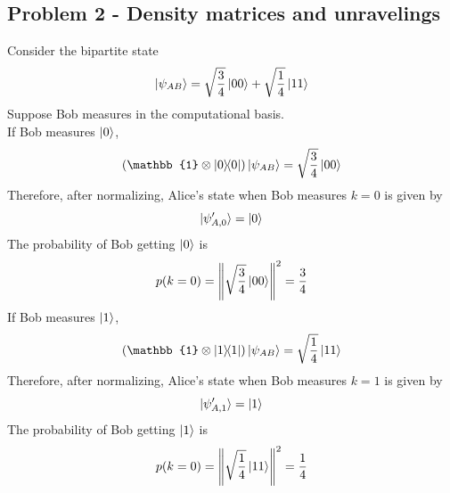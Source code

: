 \subsection{Problem 2 - Density matrices and unravelings}
Consider the bipartite state 
\begin{equation}
    \ket{\psi_{AB}} = \sqrt{\frac{3}{4}}\ket{00} + \sqrt{\frac{1}{4}}\ket{11}
\end{equation}
Suppose Bob measures in the computational basis. \\
If Bob measures $\ket{0}$, 
\begin{align}
    (\mathbb{1} \otimes \ketbra{0}{0}) \ket{\psi_{AB}} = \sqrt{\frac{3}{4}}\ket{00}
\end{align}
Therefore, after normalizing, Alice's state when Bob measures $k = 0$ is given by
\begin{equation}
    \ket{\psi'_{A,0}} = \ket{0}
\end{equation}
The probability of Bob getting $\ket{0}$ is 
\begin{equation}
    p(k=0) = \norm{\sqrt{\frac{3}{4}}\ket{00}}^2 = \frac{3}{4}
\end{equation}
If Bob measures $\ket{1}$, 
\begin{align}
    (\mathbb{1} \otimes \ketbra{1}{1}) \ket{\psi_{AB}} = \sqrt{\frac{1}{4}}\ket{11}
\end{align}
Therefore, after normalizing, Alice's state when Bob measures $k = 1$ is given by
\begin{equation}
    \ket{\psi'_{A,1}} = \ket{1}
\end{equation}
The probability of Bob getting $\ket{1}$ is 
\begin{equation}
    p(k=0) = \norm{\sqrt{\frac{1}{4}}\ket{11}}^2 = \frac{1}{4}
\end{equation}



\newpage
